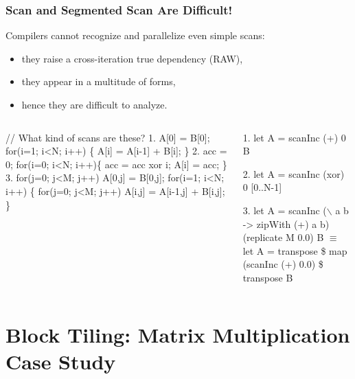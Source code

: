 \documentclass{beamer}
\newcommand{\mymath}[1]{$ #1 $}
\begin{document}
\begin{frame}[fragile,t]
  \frametitle{Scan and Segmented Scan Are Difficult!} 

Compilers cannot recognize and parallelize even simple scans:
\begin{itemize}
    \item they raise a cross-iteration true dependency (RAW),
    \item they appear in a multitude of forms,
    \item hence they are difficult to analyze.
\end  {itemize} 

\begin{columns}
\begin{colorcode}[fontsize=\scriptsize]
// What kind of scans are these?
1. A[0] = B[0];
   for(i=1; i<N; i++) \{
     A[i] = A[i-1] + B[i];
   \}
2. acc = 0;
   for(i=0; i<N; i++)\{
     acc = acc xor i;
     A[i] = acc;
   \}
3. for(j=0; j<M; j++) 
     A[0,j] = B[0,j];
   for(i=1; i<N; i++) \{
     for(j=0; j<M; j++)
       A[i,j] = A[i-1,j] + B[i,j];
   \}
\end{colorcode}
\pause
\begin{colorcode}[fontsize=\scriptsize]
1. let A = scanInc (+) 0 B

2. let A = scanInc (xor) 0 [0..N-1]

3. let A = scanInc (\mymath{\backslash} a b -> zipWith (+) a b) 
                   (replicate M 0.0) B \mymath{\equiv}
   let A = transpose \$ 
           map (scanInc (+) 0.0) \$
           transpose B 
             
\end{colorcode}
\end{columns}
\bigskip

\end{frame}

\section{Block Tiling: Matrix Multiplication Case Study}

\begin{frame}[fragile]
	\tableofcontents[currentsection]
\end{frame}
\end{document}
